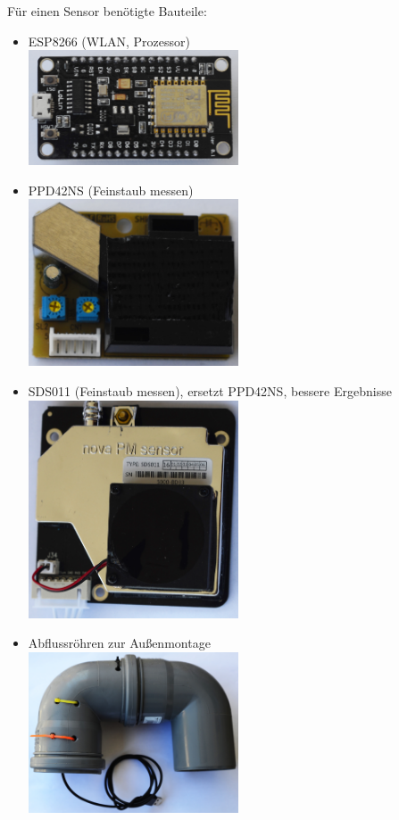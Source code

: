 \documentclass[
notumble,
]{leaflet}
\begin{document}
Für einen Sensor benötigte Bauteile:
\begin{itemize}
\item ESP8266 (WLAN, Prozessor) \\\includegraphics[width=0.49\textwidth]{images/sensor/esp8266.jpg} 
\item PPD42NS (Feinstaub messen) \\\includegraphics[width=0.49\textwidth]{images/sensor/ppd.jpg} 
\item SDS011 (Feinstaub messen), ersetzt PPD42NS, bessere Ergebnisse \\\includegraphics[width=0.49\textwidth]{images/sensor/sds011.jpg} 
\item Abflussröhren zur Außenmontage \\\includegraphics[width=0.49\textwidth]{images/sensor/roehren.jpg} 

\end{itemize}
\end{document}
